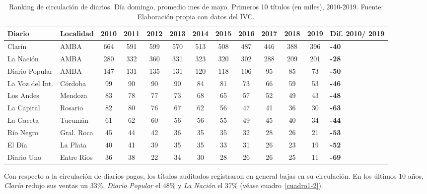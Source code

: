 \begin{table}[!ht]
\sf\footnotesize\setlength\tabcolsep{4pt}
\centering
\begin{tabular}{>{\raggedright\arraybackslash}m{1.2cm} | >{\raggedright\arraybackslash}m{1.1cm} | S[table-format=3.0] | S[table-format=3.0] | S[table-format=3.0] | S[table-format=3.0] | S[table-format=3.0] | S[table-format=3.0] | S[table-format=3.0] | S[table-format=3.0] | S[table-format=3.0] | S[table-format=3.0] | >{\raggedright\arraybackslash}m{7mm} }
\toprule
\textbf{Diario} & \textbf{Localidad} & \textbf{2010} & \textbf{2011} & \textbf{2012} & \textbf{2013} & \textbf{2014} & \textbf{2015} & \textbf{2016} & \textbf{2017} & \textbf{2018} & \textbf{2019} & \textbf{Dif. 2010/ 2019} \\
\midrule
Clarín & AMBA & 664 & 591 & 599 & 570 & 513 & 508 & 487 & 446 & 388 & 396 & \textbf{-40} \\
\midrule
La Nación & AMBA & 280 & 332 & 360 & 331 & 323 & 320 & 302 & 288 & 209 & 201 & \textbf{-28} \\
\midrule
Diario Popular & AMBA & 147 & 131 & 135 & 131 & 120 & 118 & 106 & 95 & 85 & 73 & \textbf{-50} \\
\midrule
La Voz del Int. & Córdoba & 99 & 90 & 90 & 90 & 84 & 81 & 73 & 66 & 59 & 53 & \textbf{-46} \\
\midrule
Los Andes & Mendoza & 83 & 78 & 77 & 73 & 68 & 65 & 57 & 52 & 49 & 43 & \textbf{-48} \\
\midrule
La Capital & Rosario & 82 & 80 & 76 & 67 & 62 & 56 & 47 & 41 & 36 & 30 & \textbf{-63} \\
\midrule
La Gaceta & Tucumán & 61 & 62 & 60 & 56 & 56 & 55 & 49 & 45 & 40 & 34 & \textbf{-44} \\
\midrule
Río Negro & Gral. Roca & 45 & 44 & 42 & 36 & 35 & 35 & 32 & 28 & 26 & 21 & \textbf{-53} \\
\midrule
El Día & La Plata & 40 & 41 & 39 & 35 & 35 & 33 & 31 & 26 & 23 & 19 & \textbf{-52} \\
\midrule
Diario Uno & Entre Ríos & 36 & 38 & 22 & 34 & 30 & 28 & 26 & 26 & 25 & 11 & \textbf{-69} \\
\bottomrule
\end{tabular}
\caption{Ranking de circulación de diarios. Día domingo, promedio mes de mayo. Primeros 10 títulos (en miles), 2010-2019. Fuente: Elaboración propia con datos del IVC.}\label{cuadro1-3}
\end{table}


Con respecto a la circulación de diarios pagos, los títulos auditados registraron en general bajas en su circulación. En los últimos 10 años, \emph{Clarín} redujo sus ventas un 33\%, \emph{Diario Popular} el 48\% y \emph{La Nación }el 37\% (véase cuadro~\ref{cuadro1-2}).

